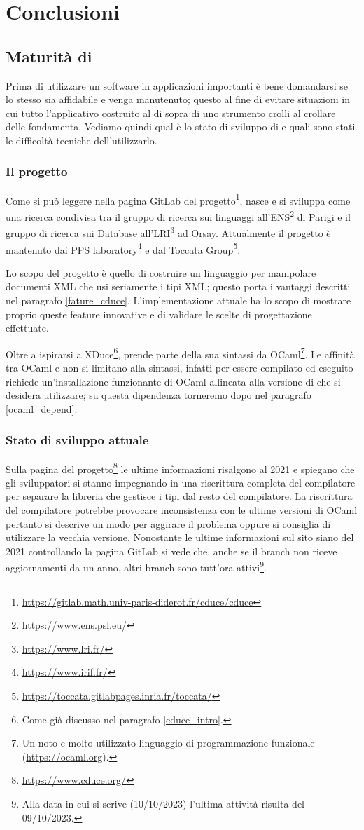 \chapter{Conclusioni}
\section{Maturità di \cduce}
Prima di utilizzare un software in applicazioni importanti è bene domandarsi se lo stesso sia affidabile e venga manutenuto; questo al fine di evitare situazioni in cui tutto l'applicativo costruito al di sopra di uno strumento crolli al crollare delle fondamenta. Vediamo quindi qual è lo stato di sviluppo di \cduce e quali sono stati le difficoltà tecniche dell'utilizzarlo.
\subsection{Il progetto \cduce}
Come si può leggere nella pagina GitLab del progetto\footnote{\url{https://gitlab.math.univ-paris-diderot.fr/cduce/cduce}}, \cduce nasce e si sviluppa come una ricerca condivisa tra il gruppo di ricerca sui linguaggi all'ENS\footnote{\url{https://www.ens.psl.eu/}} di Parigi e il gruppo di ricerca sui Database all'LRI\footnote{\url{https://www.lri.fr/}} ad Orsay. Attualmente il progetto è mantenuto dai PPS laboratory\footnote{\url{https://www.irif.fr/}} e dal  Toccata Group\footnote{\url{https://toccata.gitlabpages.inria.fr/toccata/}}.

Lo scopo del progetto è quello di costruire un linguaggio per manipolare documenti XML che usi seriamente i tipi XML; questo porta i vantaggi descritti nel paragrafo \ref{fature_cduce}. L'implementazione attuale ha lo scopo di mostrare proprio queste feature innovative e di validare le scelte di progettazione effettuate.

Oltre a ispirarsi a XDuce\footnote{Come già discusso nel paragrafo \ref{cduce_intro}.}, \cduce prende parte della sua sintassi da OCaml\footnote{Un noto e molto utilizzato linguaggio di programmazione funzionale (\url{https://ocaml.org}).}. Le affinità tra OCaml e \cduce non si limitano alla sintassi, infatti per essere compilato ed eseguito \cduce richiede un'installazione funzionante di OCaml allineata alla versione di \cduce che si desidera utilizzare; su questa dipendenza torneremo dopo nel paragrafo \ref{ocaml_depend}.
\subsection{Stato di sviluppo attuale}
Sulla pagina del progetto\footnote{\url{https://www.cduce.org/}} le ultime informazioni risalgono al 2021 e spiegano che gli sviluppatori si stanno impegnando in una riscrittura completa del compilatore per separare la libreria che gestisce i tipi dal resto del compilatore. La riscrittura del compilatore potrebbe provocare inconsistenza con le ultime versioni di OCaml pertanto si descrive un modo per aggirare il problema oppure si consiglia di utilizzare la vecchia versione. Nonostante le ultime informazioni sul sito siano del 2021 controllando la pagina GitLab si vede che, anche se il branch  non riceve aggiornamenti da un anno, altri branch sono tutt'ora attivi\footnote{Alla data in cui si scrive (10/10/2023) l'ultima attività risulta del 09/10/2023.}.
